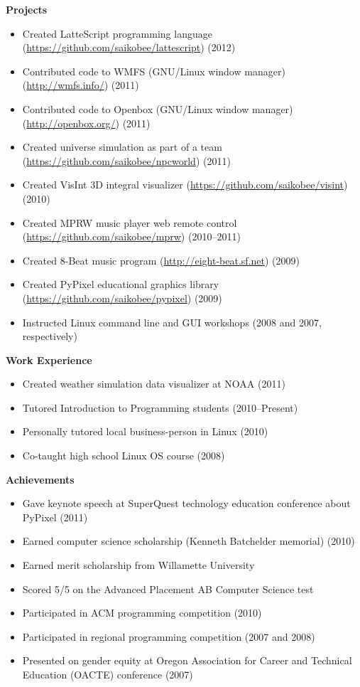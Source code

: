 \documentclass[10pt]{article}
\begin{document}
\medskip
\noindent \textbf{Projects} \hrulefill
\begin{itemize}
\item Created LatteScript programming language
    (\url{https://github.com/saikobee/lattescript}) (2012)
\item Contributed code to WMFS (GNU/Linux window manager)
    (\url{http://wmfs.info/}) (2011)
\item Contributed code to Openbox (GNU/Linux window manager)
    (\url{http://openbox.org/}) (2011)
\item Created universe simulation as part of a team
    (\url{https://github.com/saikobee/npcworld}) (2011)
\item Created VisInt 3D integral visualizer
    (\url{https://github.com/saikobee/visint}) (2010)
\item Created MPRW music player web remote control
    (\url{https://github.com/saikobee/mprw}) (2010\---2011)
\item Created 8-Beat music program
    (\url{http://eight-beat.sf.net}) (2009)
\item Created PyPixel educational graphics library
    (\url{https://github.com/saikobee/pypixel}) (2009)
\item Instructed Linux command line and GUI workshops (2008 and 2007, respectively)
\end{itemize}

\medskip
\noindent \textbf{Work Experience} \hrulefill
\begin{itemize}
\item Created weather simulation data visualizer at NOAA (2011)
\item Tutored Introduction to Programming students (2010\---Present)
\item Personally tutored local business-person in Linux (2010)
\item Co-taught high school Linux OS course (2008)
\end{itemize}

\medskip
\noindent \textbf{Achievements} \hrulefill
\begin{itemize}
\item Gave keynote speech at SuperQuest technology education conference about
PyPixel (2011)
\item Earned computer science scholarship (Kenneth Batchelder memorial) (2010)
\item Earned merit scholarship from Willamette University
\item Scored 5/5 on the Advanced Placement AB Computer Science test
\item Participated in ACM programming competition (2010)
\item Participated in regional programming competition (2007 and 2008)
\item Presented on gender equity at Oregon Association for Career and
Technical Education (OACTE) conference (2007)
\end{itemize}
\end{document}
